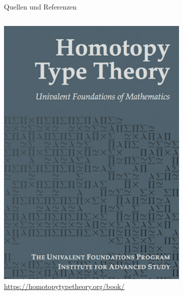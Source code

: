 \documentclass[11pt,aspectratio=169,notheorems]{beamer}
\begin{document}
\begin{frame}{Quellen und Referenzen}
    \begin{columns}[T] %
        \begin{column}{.30\textwidth}
        \begin{center}
            \includegraphics[width=0.9\textwidth]{images/cover-web}\\
            \tiny{\href{https://homotopytypetheory.org/book/}{https://homotopytypetheory.org/book/}~\cite{hottbook}}
        \end{center}
        \end{column}%
        \hfill%
        \begin{column}{.30\textwidth}
        \begin{center}

\end{center}
\end{column}
\end{columns}
\end{frame}
\end{document}
